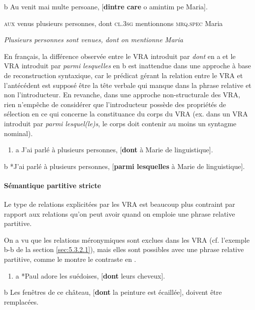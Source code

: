   b  Au venit mai multe persoane, [\textbf{dintre care} o amintim pe Maria].

    \textsc{aux} venus plusieurs personnes, dont \textsc{cl.3sg} mentionnons \textsc{mrq.spec} Maria

\textit{Plusieurs personnes sont venues, dont on mentionne Maria }  

En français, la différence observée entre le VRA introduit par \textit{dont} en a et le VRA introduit par \textit{parmi lesquelles} en b est inattendue dans une approche à base de reconstruction syntaxique, car le prédicat gérant la relation entre le VRA et l'antécédent est supposé être la tête verbale qui manque dans la phrase relative et non l'introducteur. En revanche, dans une approche non-structurale des VRA, rien n'empêche de considérer que l'introducteur possède des propriétés de sélection en ce qui concerne la constituance du corps du VRA (ex. dans un VRA introduit par \textit{parmi lesquel(le)s}, le corps doit contenir au moins un syntagme nominal). 


\begin{enumerate}
\item \label{bkm:Ref295819431}a  J'ai parlé à plusieurs personnes, [\textbf{dont} à Marie de linguistique]. 


\end{enumerate}
  b  *J'ai parlé à plusieurs personnes, [\textbf{parmi lesquelles} à Marie de linguistique].

\paragraph[Sémantique partitive stricte]{Sémantique partitive stricte}
Le type de relations explicitées par les VRA est beaucoup plus contraint par rapport aux relations qu'on peut avoir quand on emploie une phrase relative partitive. 

On a vu que les relations méronymiques sont exclues dans les VRA (cf. l'exemple b-b de la section \ref{sec:5.3.2.1}), mais elles sont possibles avec une phrase relative partitive, comme le montre le contraste en .


\begin{enumerate}
\item \label{bkm:Ref295822265}a  *Paul adore les suédoises, [\textbf{dont} leurs cheveux]. 


\end{enumerate}
  b  Les fenêtres de ce château, [\textbf{dont} la peinture est écaillée], doivent être remplacées.

